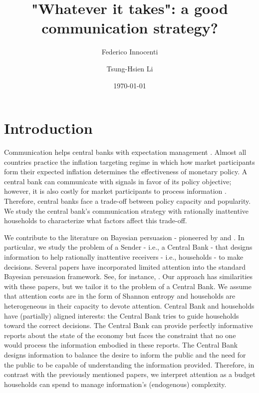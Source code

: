 \documentclass[12pt,a4paper]{article}
\title{"Whatever it takes": a good communication strategy?}
\author{Federico Innocenti \and Tsung-Hsien Li}
\date{\today}
\begin{document}
\setlength{\parskip}{2mm}

\maketitle

\section{Introduction}

Communication helps central banks with expectation management \citep{Casiraghi2022}. Almost all countries practice the inflation targeting regime in which how market participants form their expected inflation determines the effectiveness of monetary policy. A central bank can communicate with signals in favor of its policy objective; however, it is also costly for market participants to process information \citep{Sims2003}. Therefore, central banks face a trade-off between policy capacity and popularity. We study the central bank's communication strategy with rationally inattentive households to characterize what factors affect this trade-off.

We contribute to the literature on Bayesian persuasion - pioneered by \cite{aumann1995repeated} and \cite{KG2011}. In particular, we study the problem of a Sender - i.e., a Central Bank - that designs information to help rationally inattentive \citep{Sims2003} receivers - i.e., households - to make decisions. Several papers have incorporated limited attention into the standard Bayesian persuasion framework. See, for instance, \cite{Bloedel2020,Lipnowski2020,lipnowski2022,Wei2021,Matyskova2021,innocenti2022can}. Our approach has similarities with these papers, but we tailor it to the problem of a Central Bank. We assume that attention costs are in the form of Shannon entropy and households are heterogeneous in their capacity to devote attention. Central Bank and households have (partially) aligned interests: the Central Bank tries to guide households toward the correct decisions. The Central Bank can provide perfectly informative reports about the state of the economy but faces the constraint that no one would process the information embodied in these reports. The Central Bank designs information to balance the desire to inform the public and the need for the public to be capable of understanding the information provided. Therefore, in contrast with the previously mentioned papers, we interpret attention as a budget households can spend to manage information's (endogenous) complexity.
\end{document}

